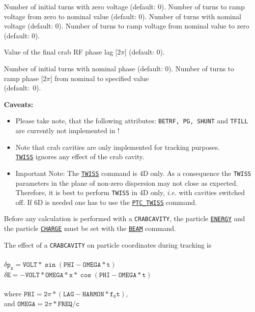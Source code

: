 \begin{madlist}
   Number of initial turns with zero voltage (default: 0).
   Number of turns to ramp voltage from zero to nominal value (default: 0).
   Number of turns with nominal voltage (default: 0).
   Number of turns to ramp voltage from nominal value to zero (default: 0).

   Value of the final crab RF phase lag [$2\pi$] (default: 0).

   Number of initial turns with nominal phase (default: 0).
   Number of turns to ramp phase [$2\pi$] from nominal to
    specified value \\ (default:~0).

\end{madlist}

\textbf{Caveats:}
\begin{itemize}
   \item Please take note, that the following \madeight attributes:
     \texttt{BETRF, PG, SHUNT} and \texttt{TFILL} are currently not
     implemented in \madx!
   \item Note that crab cavities are only implemented for
     tracking  purposes. \\
     \hyperref[chap:twiss]{\texttt{TWISS}} ignores any effect of the
     crab cavity.
   \item Important Note: The \hyperref[chap:twiss]{\texttt{TWISS}} command
     is 4D only. As a consequence the \texttt{TWISS} parameters in the plane
     of non-zero dispersion may not close as expected. Therefore, it is best
     to perform \texttt{TWISS} in 4D only, \textsl{i.e.} with cavities
     switched off. If 6D is needed one has to use the
     \hyperref[sec:ptc-twiss]{\texttt{PTC\_TWISS}} command.
\end{itemize}


Before any calculation is performed with a \texttt{CRABCAVITY}, the particle
\hyperref[sec:beam]{\texttt{ENERGY}} and the particle
\hyperref[sec:beam]{\texttt{CHARGE}} must be set with the
\hyperref[sec:beam]{\texttt{BEAM}} command.

The effect of a \texttt{CRABCAVITY} on particle coordinates during tracking is
\\
\\ $\mathtt{\delta p_x  = VOLT * \sin(PHI - OMEGA * t)}$
\\ $\mathtt{\delta E  = - VOLT * OMEGA * x * \cos (PHI - OMEGA * t)}$
\\
\\ where $\mathtt{PHI =  2\pi * (LAG - HARMON * f_0 t)}$,
\\ and $\mathtt{OMEGA = 2\pi * FREQ / c}$
\\


